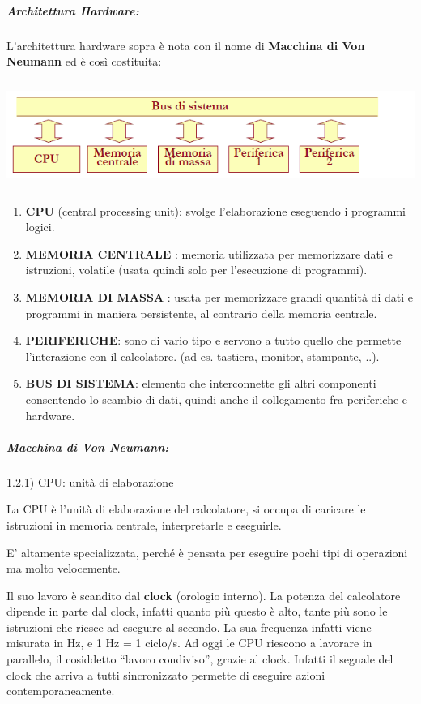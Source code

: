 \documentclass[
  paper=a4,
  oneside  ,captions=tableheading
]{scrbook}
\providecommand{\tightlist}{%
  \setlength{\itemsep}{0pt}\setlength{\parskip}{0pt}}
\begin{document}
\hypertarget{architettura-hardware}{%
\subparagraph{Architettura Hardware:}\label{architettura-hardware}}

L'architettura hardware sopra è nota con il nome di \textbf{Macchina di
Von Neumann} ed è così costituita:

\includegraphics[height=3.5cm]{./image/image-20201111172642835.png}

\begin{enumerate}
\def\labelenumi{\arabic{enumi}.}
\tightlist
\item
  \textbf{CPU} (central processing unit): svolge l'elaborazione
  eseguendo i programmi logici.
\item
  \textbf{MEMORIA CENTRALE }: memoria utilizzata per memorizzare dati e
  istruzioni, volatile (usata quindi solo per l'esecuzione di
  programmi).
\item
  \textbf{MEMORIA DI MASSA }: usata per memorizzare grandi quantità di
  dati e programmi in maniera persistente, al contrario della memoria
  centrale.
\item
  \textbf{PERIFERICHE}: sono di vario tipo e servono a tutto quello che
  permette l'interazione con il calcolatore. (ad es. tastiera, monitor,
  stampante, ..).
\item
  \textbf{BUS DI SISTEMA}: elemento che interconnette gli altri
  componenti consentendo lo scambio di dati, quindi anche il
  collegamento fra periferiche e hardware.
\end{enumerate}

\hypertarget{macchina-di-von-neumann}{%
\subparagraph{Macchina di Von Neumann:}\label{macchina-di-von-neumann}}

1.2.1) CPU: unità di elaborazione

La CPU è l'unità di elaborazione del calcolatore, si occupa di caricare
le istruzioni in memoria centrale, interpretarle e eseguirle.

E' altamente specializzata, perché è pensata per eseguire pochi tipi di
operazioni ma molto velocemente.

Il suo lavoro è scandito dal \textbf{clock} (orologio interno). La
potenza del calcolatore dipende in parte dal clock, infatti quanto più
questo è alto, tante più sono le istruzioni che riesce ad eseguire al
secondo. La sua frequenza infatti viene misurata in Hz, e 1 Hz = 1
ciclo/s. Ad oggi le CPU riescono a lavorare in parallelo, il cosiddetto
``lavoro condiviso'', grazie al clock. Infatti il segnale del clock che
arriva a tutti sincronizzato permette di eseguire azioni
contemporaneamente.
\end{document}
